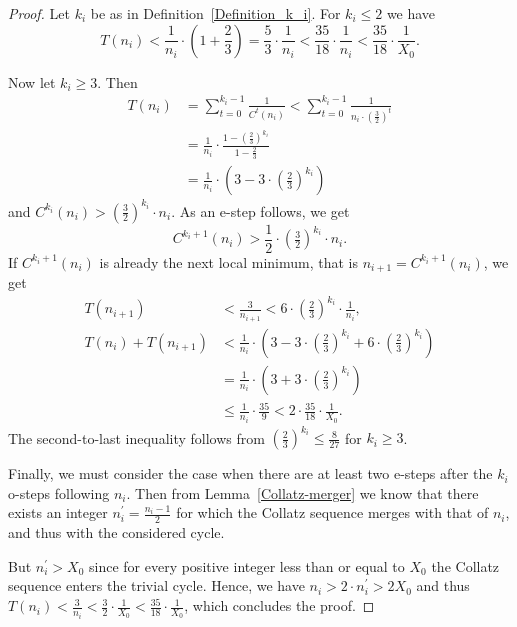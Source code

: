 \documentclass[12pt,reqno]{article}
\begin{document}
\begin{proof}
Let $k_i$ be as in Definition~\ref{Definition_k_i}. For $k_i\leq 2$ we have 
\[T(n_i) < \frac{1}{n_i} \cdot \left( 1+\frac{2}{3} \right) =\frac{5}{3} \cdot \frac{1}{n_i} < \frac{35}{18} \cdot \frac{1}{n_i}<\frac{35}{18} \cdot \frac{1}{X_0}.\] 

Now let $k_i\geq 3$. Then 
\begin{align*}
T(n_i)&=\sum_{t=0}^{k_i-1} \frac{1}{C^t(n_i)}< \sum_{t=0}^{k_i-1} \frac{1}{n_i \cdot \left(\tfrac{3}{2}\right)^t}\\
 &= \frac{1}{n_i} \cdot \frac{1-\left(\frac{2}{3}\right)^{k_i}}{1-\frac{2}{3}}\\
 &= \frac{1}{n_i} \cdot  \left(3 - 3 \cdot \left(\frac{2}{3}\right)^{k_i} \right)
\end{align*}
and $C^{k_i}(n_i) > \left(\tfrac{3}{2}\right)^{k_i} \cdot n_i$. As an e-step follows, we get 
\[C^{k_i+1}(n_i) > \frac{1}{2} \cdot \left(\tfrac{3}{2}\right)^{k_i} \cdot n_i.\]
If $C^{k_i+1}(n_i)$ is already the next local minimum, that is $n_{i+1}=C^{k_i+1}(n_i)$, we get 
\begin{align*}
T(n_{i+1})&< \frac{3}{n_{i+1}} < 6 \cdot \left(\frac{2}{3}\right)^{k_i} \cdot \frac{1}{n_i}, \\
T(n_i)+T(n_{i+1}) &< \frac{1}{n_i} \cdot \left(3 - 3 \cdot \left(\frac{2}{3}\right)^{k_i} + 6 \cdot \left(\frac{2}{3}\right)^{k_i}  \right)\\
 &=  \frac{1}{n_i} \cdot \left(3 + 3 \cdot \left(\frac{2}{3}\right)^{k_i}  \right)\\
 &\leq \frac{1}{n_i} \cdot \frac{35}{9} < 2 \cdot \frac{35}{18} \cdot \frac{1}{X_0}.
\end{align*}
The second-to-last inequality follows from $\left(\tfrac{2}{3}\right)^{k_i}\leq \tfrac{8}{27}$ for $k_i\geq 3$.

Finally, we must consider the case when there are at least two e-steps after the $k_i$ o-steps following $n_i$. Then from Lemma~\ref{Collatz-merger} we know that  there exists an integer $n_i^{\prime}=\tfrac{n_i-1}{2}$ for which the Collatz sequence merges with that of $n_i$, and thus with the considered cycle.

But $n_i^{\prime}>X_0$ since for every positive integer less than or equal to $X_0$ the Collatz sequence enters the trivial cycle. Hence, we have $n_i>2\cdot n_i^{\prime}>2X_0$ and thus $T(n_i)<\tfrac{3}{n_i}<\tfrac{3}{2} \cdot \tfrac{1}{X_0}<\tfrac{35}{18} \cdot \tfrac{1}{X_0}$, which concludes the proof. 
\end{proof}
\end{document}
